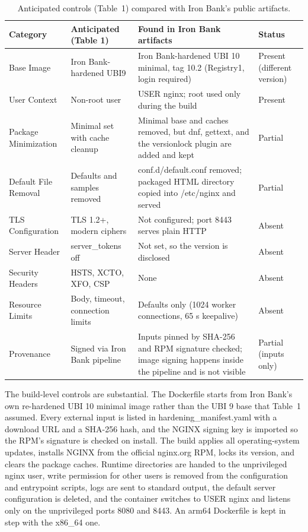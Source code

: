 \documentclass[10pt,letterpaper,twocolumn]{article}
\begin{document}
\begin{table}[tb]
\caption{Anticipated controls (Table~1) compared with Iron Bank's public artifacts.}
\label{tab:anticipated-vs-found}
\small
\begin{tabularx}{\textwidth}{@{}P{0.16\textwidth}P{0.2\textwidth}LP{0.15\textwidth}@{}}
\toprule
\textbf{Category} & \textbf{Anticipated (Table 1)} & \textbf{Found in Iron Bank artifacts} & \textbf{Status} \\
\midrule
Base Image & Iron Bank-hardened UBI9 & Iron Bank-hardened UBI 10 minimal, tag 10.2 (Registry1, login required) & Present (different version) \\
User Context & Non-root user & USER nginx; root used only during the build & Present \\
Package Minimization & Minimal set with cache cleanup & Minimal base and caches removed, but dnf, gettext, and the versionlock plugin are added and kept & Partial \\
Default File Removal & Defaults and samples removed & conf.d/default.conf removed; packaged HTML directory copied into /etc/nginx and served & Partial \\
TLS Configuration & TLS 1.2+, modern ciphers & Not configured; port 8443 serves plain HTTP & Absent \\
Server Header & server\_tokens off & Not set, so the version is disclosed & Absent \\
Security Headers & HSTS, XCTO, XFO, CSP & None & Absent \\
Resource Limits & Body, timeout, connection limits & Defaults only (1024 worker connections, 65 s keepalive) & Absent \\
Provenance & Signed via Iron Bank pipeline & Inputs pinned by SHA-256 and RPM signature checked; image signing happens inside the pipeline and is not visible & Partial (inputs only) \\
\bottomrule
\end{tabularx}
\end{table}

The build-level controls are substantial. The Dockerfile starts from Iron Bank's own re-hardened UBI 10 minimal image rather than the UBI 9 base that Table~1 assumed. Every external input is listed in hardening\_manifest.yaml with a download URL and a SHA-256 hash, and the NGINX signing key is imported so the RPM's signature is checked on install. The build applies all operating-system updates, installs NGINX from the official nginx.org RPM, locks its version, and clears the package caches. Runtime directories are handed to the unprivileged nginx user, write permission for other users is removed from the configuration and entrypoint scripts, logs are sent to standard output, the default server configuration is deleted, and the container switches to USER nginx and listens only on the unprivileged ports 8080 and 8443. An arm64 Dockerfile is kept in step with the x86\_64 one.
\end{document}
